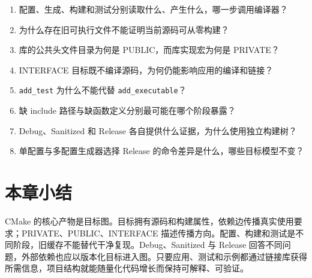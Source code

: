 \begin{enumerate}
  \item 配置、生成、构建和测试分别读取什么、产生什么，哪一步调用编译器？
  \item 为什么存在旧可执行文件不能证明当前源码可从零构建？
  \item 库的公共头文件目录为何是 PUBLIC，而库实现宏为何是 PRIVATE？
  \item INTERFACE 目标既不编译源码，为何仍能影响应用的编译和链接？
  \item \texttt{add\_test} 为什么不能代替 \texttt{add\_executable}？
  \item 缺 include 路径与缺函数定义分别最可能在哪个阶段暴露？
  \item Debug、Sanitized 和 Release 各自提供什么证据，为什么使用独立构建树？
  \item 单配置与多配置生成器选择 Release 的命令差异是什么，哪些目标模型不变？
\end{enumerate}


\section{本章小结}

CMake 的核心产物是目标图。目标拥有源码和构建属性，依赖边传播真实使用要求；PRIVATE、PUBLIC、INTERFACE 描述传播方向。配置、构建和测试是不同阶段，旧缓存不能替代干净复现。Debug、Sanitized 与 Release 回答不同问题，外部依赖也应以版本化目标进入图。只要应用、测试和示例都通过链接库获得所需信息，项目结构就能随量化代码增长而保持可解释、可验证。
